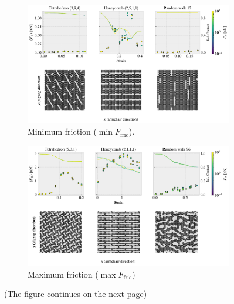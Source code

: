 \begin{figure}[H]
  \centering
  \begin{subfigure}[t]{1\textwidth}
      \centering
      \includegraphics[width=\linewidth]{figures/stretch_profiles/PP_min.pdf}
      \caption{Minimum friction ($\min F_{\text{fric}}$).}
      \label{fig:PP_min}
  \end{subfigure}
  \hfill
  \vspace{1cm}
  \begin{subfigure}[t]{1\textwidth}
      \centering
      \includegraphics[width=\linewidth]{figures/stretch_profiles/PP_max.pdf}
      \caption{Maximum friction ($\max F_{\text{fric}}$)}
      \label{fig:PP_max}
  \end{subfigure}
  \hfill
  \caption{(The figure continues on the next page)}
\end{figure}

